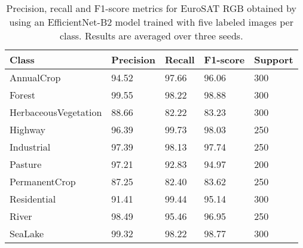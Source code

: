 \documentclass[journal]{IEEEtran}
\begin{document}
\begin{table}
\caption{Precision, recall and F1-score metrics for EuroSAT RGB obtained by using an EfficientNet-B2 model trained with five labeled images per class. Results are averaged over three seeds.}
\begin{center}
 {\tabulinesep=0.5mm
\setlength\tabcolsep{2pt}
\begin{tabu} { |X[2]|| X[1c] | X[1c] | X[1c] | X[1c]|}
\hline
Class  & Precision & Recall & F1-score & Support \\ \hline
AnnualCrop             & 94.52  & 97.66 & 96.06 & 300 \\ \hline
Forest                 & 99.55  & 98.22 & 98.88 & 300 \\ \hline
HerbaceousVegetation   & 88.66  & 82.22 & 83.23 & 300 \\ \hline
Highway                & 96.39  & 99.73 & 98.03 & 250 \\ \hline
Industrial             & 97.39  & 98.13 & 97.74 & 250 \\ \hline
Pasture                & 97.21  & 92.83 & 94.97 & 200 \\ \hline
PermanentCrop          & 87.25  & 82.40 & 83.62 & 250 \\ \hline
Residential            & 91.41  & 99.44 & 95.14 & 300 \\ \hline
River                  & 98.49  & 95.46 & 96.95 & 250 \\ \hline
SeaLake                & 99.32  & 98.22 & 98.77 & 300 \\ \hline
\end{tabu}}
\label{table:EuroSAT_RGBMetrics}
\end{center}
\end{table}
\end{document}
